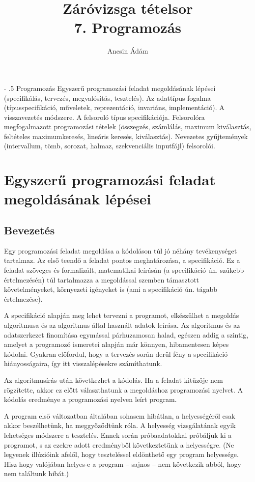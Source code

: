 \documentclass[margin=0px]{article}
\title{Záróvizsga tételsor \\ \large 7. Programozás}
\date{}
\author{Ancsin Ádám}
\makeatletter
\newenvironment{tetel}[1]{\paragraph{#1}}{}
\renewcommand\paragraph{%
	\@startsection{paragraph}{4}{0mm}%
	{-\baselineskip}%
	{.5\baselineskip}%
	{\normalfont\normalsize\bfseries}}
\makeatother
\begin{document}
	\maketitle
	
	\begin{tetel}{Programozás}
			Egyszerű programozási feladat megoldásának lépései (specifikálás, tervezés, megvalósítás, tesztelés). Az adattípus fogalma (típusspecifikáció, műveletek, reprezentáció, invariáns, implementáció). A visszavezetés módszere. A felsoroló típus specifikációja. Felsorolóra megfogalmazott programozási tételek (összegzés, számlálás, maximum kiválasztás, feltételes maximumkeresés, lineáris keresés, kiválasztás). Nevezetes gyűjtemények (intervallum, tömb, sorozat, halmaz, szekvenciális inputfájl) felsorolói.
	\end{tetel}
	
	
	\section{Egyszerű programozási feladat megoldásának lépései}
	\subsection{Bevezetés}
	Egy programozási feladat megoldása a kódoláson túl jó néhány tevékenységet tartalmaz.
	Az első teendő a feladat pontos meghatározása, a specifikáció. Ez a feladat szöveges és formalizált, matematikai leírásán (a specifikáció ún. szűkebb értelmezésén) túl tartalmazza a megoldással szemben támasztott követelményeket, környezeti igényeket is (ami a specifikáció ún. tágabb értelmezése).
	
	A specifikáció alapján meg lehet tervezni a programot, elkészülhet a megoldás algoritmusa és az algoritmus által használt adatok leírása. Az algoritmus és az adatszerkezet finomítása egymással párhuzamosan halad, egészen addig a szintig, amelyet a programozó ismeretei alapján már könnyen, hibamentesen képes kódolni. Gyakran előfordul, hogy a tervezés során derül fény a specifikáció hiányosságaira, így itt visszalépésekre számíthatunk.
	
	Az algoritmusírás után következhet a kódolás. Ha a feladat kitűzője nem rögzítette, akkor ez előtt választhatunk a megoldáshoz programozási nyelvet. A kódolás eredménye a programozási nyelven leírt program.
	
	A program első változatban általában sohasem hibátlan, a helyességéről csak akkor beszélhetünk, ha meggyőződtünk róla. A helyesség vizsgálatának egyik lehetséges módszere a tesztelés. Ennek során próbaadatokkal próbáljuk ki a programot, s az ezekre adott eredményből következtetünk a helyességre. (Ne legyenek illúzióink afelől, hogy teszteléssel eldönthető egy program helyessége. Hisz hogy valójában helyes-e a program – sajnos – nem következik abból, hogy nem találtunk hibát.)
	
\end{document}
